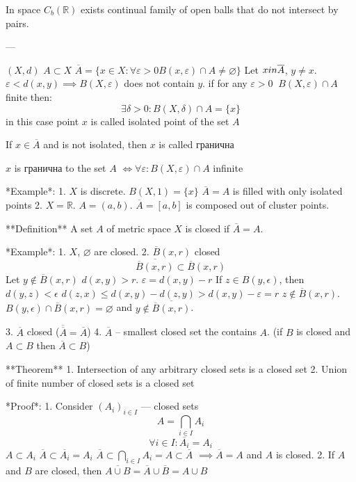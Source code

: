In space $C_{b}(\mathbb{R})$ exists continual family of open balls that do not intersect by pairs.


---

$(X,d)$
$A \subset X$
$\overline{A} = \{ x \in X: \forall \varepsilon > 0 B(x, \varepsilon) \cap A \neq \varnothing \}$
Let $x \\in \overline{A}$, $y \neq x$. $\varepsilon < d(x,y) \implies B(X, \varepsilon)$ does not contain $y$.
if for any $\varepsilon > 0 \;\; B(X, \varepsilon) \cap A$ finite then:
$$
\exists \delta > 0: B(X, \delta) \cap A = \{ x \}
$$
in this case point $x$ is called isolated point of the set $A$

If $x \in \overline{A}$ and is not isolated, then $x$ is called гранична

$x$ is гранична to the set $A$ $\iff \forall \varepsilon: B(X, \varepsilon) \cap A$  infinite

*Example*:
1. $X$ is discrete. $B(X,1) = \{ x \}$
$\overline{A} = A$ is filled with only isolated points
2. $X = \mathbb{R}$. $A = (a,b)$. $\overline{A} = [a, b]$ is composed out of cluster points.

**Definition**
A set $A$ of metric space $X$ is closed if $\overline{A} = A$.

*Example*:
1. $X$, $\varnothing$ are closed.
2. $\overline{B}(x, r)$ closed
$$
\overline{\overline{B} (x,r)} \subset \overline{B}(x, r)
$$
Let $y \not\in \overline{B}(x,r)$
$d(x,y) > r$. $\varepsilon = d(x,y) - r$
If $z \in B(y,\epsilon)$, then $d(y,z) < \epsilon$
$d(z,x) \leq d(x,y) - d(z,y) > d(x,y) - \varepsilon = r$
$z \not\in \overline{B}(x,r)$.
$B(y,\epsilon) \cap \overline{B}(x,r) = \varnothing$ and $y \not\in \overline{\overline{B}(x,r)}$.

3. $\overline{A}$ closed ($\overline{\overline{A}} = \overline{A}$)
4. $\overline{A}$ – smallest closed set the contains $A$. (if $B$ is closed and $A \subset B$ then $\overline{A} \subset B$)

**Theorem**
1. Intersection of any arbitrary closed sets is a closed set
2. Union of finite number of closed sets is a closed set

*Proof*:
1. Consider $(A_{i})_{i \in I}$ — closed sets
$$A = \bigcap_{i \in I} A_{i}$$
$$
\forall i \in I : \overline{A_{i}} = A_{i}
$$
$A \subset A_{i}$
$\overline{A} \subset \overline{A_{i}} = A_{i}$
$\overline{A} \subset \bigcap_{i \in I} A_{i} = A \subset \overline{A}$
$\implies \overline{A} = A$ and $A$ is closed.
2. If $A$ and $B$ are closed, then $\overline{A \cup B} = \overline{A} \cup \overline{B} = A \cup B$



